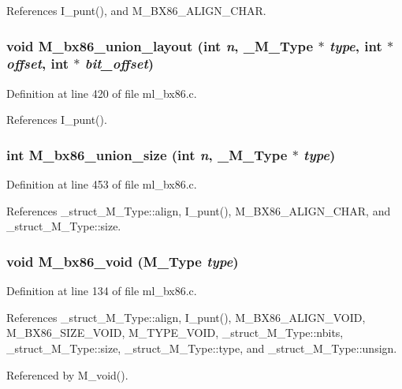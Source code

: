 References I\_\-punt(), and M\_\-BX86\_\-ALIGN\_\-CHAR.
\subsubsection{\setlength{\rightskip}{0pt plus 5cm}void M\_\-bx86\_\-union\_\-layout (int {\em n}, \bf{\_\-M\_\-Type} $\ast$ {\em type}, int $\ast$ {\em offset}, int $\ast$ {\em bit\_\-offset})}\label{m__bx86_8h_ab14e501b9aa492a29bc15baf1196b57}




Definition at line 420 of file ml\_\-bx86.c.

References I\_\-punt().
\subsubsection{\setlength{\rightskip}{0pt plus 5cm}int M\_\-bx86\_\-union\_\-size (int {\em n}, \bf{\_\-M\_\-Type} $\ast$ {\em type})}\label{m__bx86_8h_455fff4924c59a257d94edd6f8d34f49}




Definition at line 453 of file ml\_\-bx86.c.

References \_\-struct\_\-M\_\-Type::align, I\_\-punt(), M\_\-BX86\_\-ALIGN\_\-CHAR, and \_\-struct\_\-M\_\-Type::size.
\subsubsection{\setlength{\rightskip}{0pt plus 5cm}void M\_\-bx86\_\-void (\bf{M\_\-Type} {\em type})}\label{m__bx86_8h_add5ab9a34d587374f638a42b1e805a6}




Definition at line 134 of file ml\_\-bx86.c.

References \_\-struct\_\-M\_\-Type::align, I\_\-punt(), M\_\-BX86\_\-ALIGN\_\-VOID, M\_\-BX86\_\-SIZE\_\-VOID, M\_\-TYPE\_\-VOID, \_\-struct\_\-M\_\-Type::nbits, \_\-struct\_\-M\_\-Type::size, \_\-struct\_\-M\_\-Type::type, and \_\-struct\_\-M\_\-Type::unsign.

Referenced by M\_\-void().
